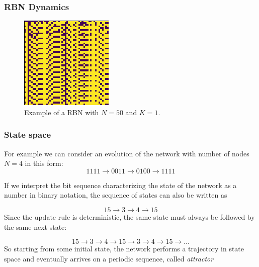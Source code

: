 \documentclass{beamer}
\begin{document}
\begin{frame}
\frametitle{RBN Dynamics}
\begin{figure}

\includegraphics{rbn.png}
\caption{Example of a RBN with $N=50$ and $K=1$. }
\end{figure}
\end{frame}


\begin{frame}
\frametitle{State space}
For example we can consider an evolution of the network with number of nodes $N=4$ in this form:
$$
1111 \to 0011 \to 0100 \to 1111
$$

If we interpret the bit sequence characterizing the state of the network as a number in binary notation, the sequence of states can also be
written as

$$
15 \to 3 \to 4 \to 15
$$
 Since
the update rule is deterministic, the same state must always be followed by
the same next state:

$$
15 \to 3 \to 4 \to 15 \to 3 \to 4 \to 15 \to \dots
$$
So starting from some initial state, the network performs a trajectory in state space and eventually arrives on a periodic sequence, called \emph{attractor}
\end{frame}
\end{document}
